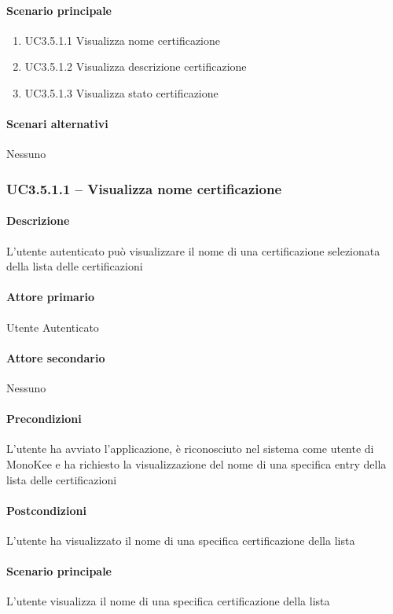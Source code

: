 \paragraph{Scenario principale}  
    \begin{enumerate}
        \item UC3.5.1.1 Visualizza nome certificazione
        \item UC3.5.1.2 Visualizza descrizione certificazione
        \item UC3.5.1.3 Visualizza stato certificazione
    \end{enumerate}
\paragraph{Scenari alternativi}  Nessuno




\subsubsection{UC3.5.1.1 – Visualizza nome certificazione}
\paragraph{Descrizione}  L’utente autenticato può visualizzare il nome di una certificazione selezionata della lista delle certificazioni
\paragraph{Attore primario}  Utente Autenticato
\paragraph{Attore secondario}  Nessuno
\paragraph{Precondizioni} L’utente ha avviato l’applicazione, è riconosciuto nel sistema come utente di MonoKee e ha richiesto la visualizzazione del nome di una specifica entry della lista delle certificazioni
\paragraph{Postcondizioni}  L’utente ha visualizzato il nome di una specifica certificazione della lista
\paragraph{Scenario principale}  
L’utente visualizza il nome di una specifica certificazione della lista
